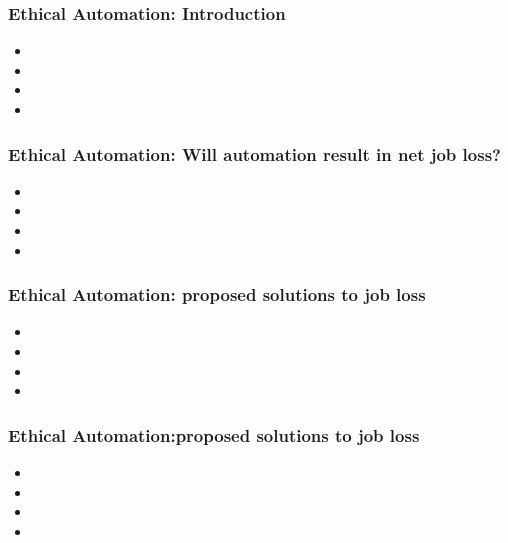 \begin{frame}
    \frametitle{ Ethical Automation: Introduction}
    \begin{itemize}
	\item
    
     
	\item 
	  
	\item
		
   	 \item 
   	   
    \end{itemize}
\end{frame}
\begin{frame}
    \frametitle{ Ethical Automation: Will automation result in net job loss?}
    \begin{itemize}
	\item
    
     
	\item 
	  
	\item
		
   	 \item 
   	   
    \end{itemize}
\end{frame}
\begin{frame}
    \frametitle{ Ethical Automation: proposed solutions to job loss}
    \begin{itemize}
	\item
    
     
	\item 
	  
	\item
		
   	 \item 
   	   
    \end{itemize}
\end{frame}
\begin{frame}
    \frametitle{ Ethical Automation:proposed solutions to job loss}
    \begin{itemize}
	\item
    
     
	\item 
	  
	\item
		
   	 \item 
   	   
    \end{itemize}
\end{frame}
